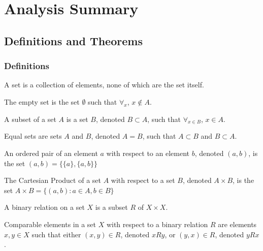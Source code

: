 \documentclass[crop=false,class=book]{standalone}
\begin{document}
\chapter{Analysis Summary}
\section{Definitions and Theorems}
\subsection{Definitions}
\begin{definition}
    \label{Definition:MathEnc:Analysis:Sum:Sets}
    A set is a collection of elements, none of which are the set itself.
\end{definition}
\begin{definition}
    \label{Definition:MathEnc:Analysis:Sum:EmptySet}
    The empty set is the set $\emptyset$ such that $\forall_{x}$,
    $x\notin A$.
\end{definition}
\begin{definition}
    \label{Definition:MathEnc:Analysis:Sum:Subsets}
    A subset of a set $A$ is a set $B$, denoted $B\subset A$, such
    that $\forall_{x\in B}$, $x\in A$.
\end{definition}
\begin{definition}
    \label{Definition:MathEnc:Analysis:Sum:Equality}
    Equal sets are sets $A$ and $B$, denoted $A=B$, such that
    $A\subset B$ and $B\subset A$.
\end{definition}
\begin{definition}
    \label{Definition:MathEnc:Analysis:Sum:OrderedPair}
    An ordered pair of an element $a$ with respect to an element $b$,
    denoted $(a,b)$, is the set $(a,b)=\{\{a\},\{a,b\}\}$
\end{definition}
\begin{definition}
    \label{Definition:MathEnc:Analysis:Sum:CartesianProduct}
    The Cartesian Product of a set $A$ with respect to a set $B$, denoted
    $A\times B$, is the set $A\times B = \{(a,b):a\in A,b\in B\}$
\end{definition}
\begin{definition}
    \label{Definition:MathEnc:Analysis:Sum:BinaryRelation}
    A binary relation on a set $X$ is a subset $R$ of $X\times X$.
\end{definition}
\begin{definition}
    \label{Definition:MathEnc:Analysis:Sum:ComparableElements}
    Comparable elements in a set $X$ with respect to a binary relation $R$
    are elements $x,y\in X$ such that either $(x,y)\in R$, denoted $xRy$,
    or $(y,x)\in R$, denoted $yRx$.
\end{definition}
\end{document}
